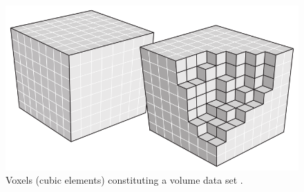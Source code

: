 \begin{figure}
	\centering
	\includegraphics[width=0.6\linewidth]{images/hadwiger_advanced_2009}
	\caption{Voxels (cubic elements) constituting a volume data set \cite{hadwiger_advanced_2009}.}
	\label{fig:hadwiger_advanced_2009}
\end{figure}


